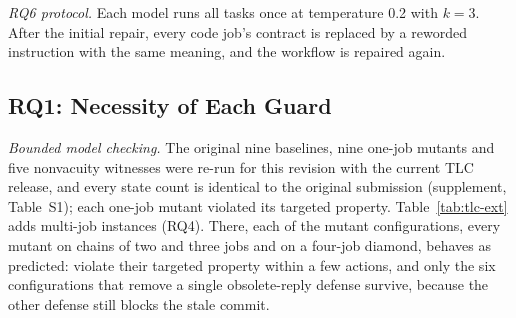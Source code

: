 \emph{RQ6 protocol.} Each model runs all \BenchTasks{} tasks once at temperature 0.2 with $k=3$. After the initial repair, every code job's contract is replaced by a reworded instruction with the same meaning, and the workflow is repaired again.

\subsection{RQ1: Necessity of Each Guard}\label{sec:rq1}
\emph{Bounded model checking.} The original nine baselines, nine one-job mutants and five nonvacuity witnesses were re-run for this revision with the current TLC release, and every state count is identical to the original submission (supplement, Table~S1); each one-job mutant violated its targeted property. Table~\ref{tab:tlc-ext} adds multi-job instances (RQ4). There, each of the \TLCExtMutants{} mutant configurations, every mutant on chains of two and three jobs and on a four-job diamond, behaves as predicted: \TLCExtMutantsCaught{} violate their targeted property within a few actions, and only the six configurations that remove a single obsolete-reply defense survive, because the other defense still blocks the stale commit.


